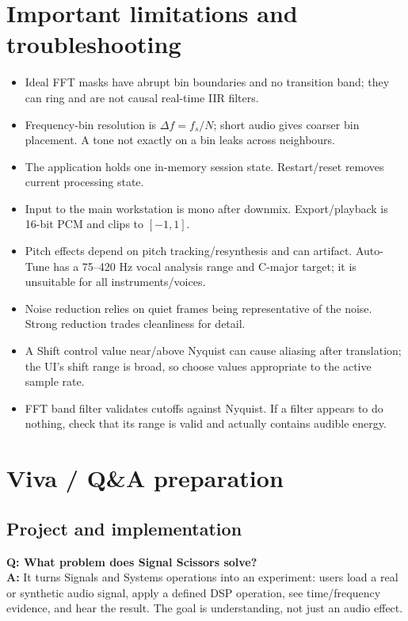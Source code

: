 \documentclass[11pt,a4paper]{article}
\begin{document}
\section{Important limitations and troubleshooting}
\begin{itemize}
\item Ideal FFT masks have abrupt bin boundaries and no transition band; they can ring and are not causal real-time IIR filters.
\item Frequency-bin resolution is \(\Delta f=f_s/N\); short audio gives coarser bin placement. A tone not exactly on a bin leaks across neighbours.
\item The application holds one in-memory session state. Restart/reset removes current processing state.
\item Input to the main workstation is mono after downmix. Export/playback is 16-bit PCM and clips to \([-1,1]\).
\item Pitch effects depend on pitch tracking/resynthesis and can artifact. Auto-Tune has a 75--420 Hz vocal analysis range and C-major target; it is unsuitable for all instruments/voices.
\item Noise reduction relies on quiet frames being representative of the noise. Strong reduction trades cleanliness for detail.
\item A Shift control value near/above Nyquist can cause aliasing after translation; the UI's shift range is broad, so choose values appropriate to the active sample rate.
\item FFT band filter validates cutoffs against Nyquist. If a filter appears to do nothing, check that its range is valid and actually contains audible energy.
\end{itemize}

\section{Viva / Q\&A preparation}
\subsection*{Project and implementation}
\textbf{Q: What problem does Signal Scissors solve?}\\
\textbf{A:} It turns Signals and Systems operations into an experiment: users load a real or synthetic audio signal, apply a defined DSP operation, see time/frequency evidence, and hear the result. The goal is understanding, not just an audio effect.
\end{document}
